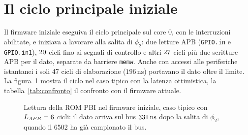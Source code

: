 \documentclass[11pt,a4paper,twoside,openright]{report}
\newcommand{\busok}[4]{%
  \draw[busv] (#2,#1) -- ++(4,0.22) -- (#3-4,#1+0.22) -- (#3,#1) -- (#3-4,#1-0.22) -- (#2+4,#1-0.22) -- cycle;
  \node[font=\tiny] at ({(#2+#3)/2},#1) {#4};}
\newcommand{\busz}[3]{\draw[line width=0.8pt, gray] (#2,#1) -- (#3,#1);}
\newcommand{\act}[5]{%
  \fill[#5] (#2,#1-0.16) rectangle (#3,#1+0.16);
  \draw[black!60, line width=0.3pt] (#2,#1-0.16) rectangle (#3,#1+0.16);
  \node[font=\tiny] at ({(#2+#3)/2},#1) {#4};}
\newcommand{\ns}{\,\mathrm{ns}}
\DeclareRobustCommand{\code}[1]{\begingroup\renewcommand{\_}{\textunderscore\allowbreak}\texttt{#1}\endgroup}
\newcommand{\sig}[1]{\textsf{#1}}
\begin{document}
\section{Il ciclo principale iniziale}

Il firmware iniziale eseguiva il ciclo principale sul core 0, con le interruzioni abilitate,
e iniziava a lavorare alla salita di $\phi_2$: due letture APB (\code{GPIO.in} e
\code{GPIO.in1}), $20$ cicli fino ai segnali di controllo e altri $27$ cicli più
due scritture APB per il dato, separate da barriere \code{memw}. Anche con accessi alle
periferiche istantanei i soli 47 cicli di elaborazione ($196\ns$) portavano il dato oltre il
limite. La figura~\ref{fig:lettura-old} mostra il ciclo nel caso tipico con la latenza
ottimistica, la tabella~\ref{tab:confronto} il confronto con il firmware attuale.

\begin{figure}[htbp]
  \centering
  \caption[Lettura nel firmware iniziale]{Lettura della ROM PBI nel firmware iniziale, caso
  tipico con $L_{APB} = 6$ cicli: il dato arriva sul bus $\SgBus\ns$ dopo la salita
  di $\phi_2$, quando il 6502 ha già campionato il bus.}
  \label{fig:lettura-old}
\end{figure}
\end{document}
